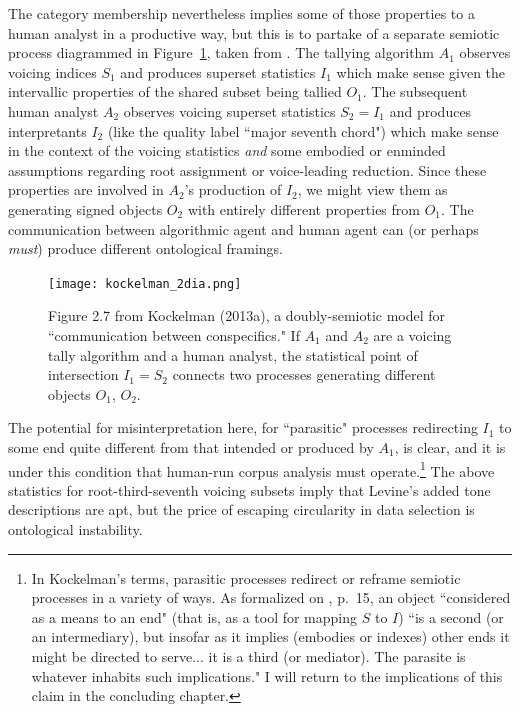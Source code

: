 The category membership nevertheless implies some of those properties to a human analyst in a productive way, but this is to partake of a separate semiotic process diagrammed in Figure~\ref{kockelman_2dia}, taken from \cite{kockelman2013}.  The tallying algorithm $A_1$ observes voicing indices $S_1$ and produces superset statistics $I_1$ which make sense given the intervallic properties of the shared subset being tallied $O_1$.  The subsequent human analyst $A_2$ observes voicing superset statistics $S_2 = I_1$ and produces interpretants $I_2$ (like the quality label ``major seventh chord") which make sense in the context of the voicing statistics \emph{and} some embodied or enminded assumptions regarding root assignment or voice-leading reduction.  Since these properties are involved in $A_2$'s production of $I_2$, we might view them as generating signed objects $O_2$ with entirely different properties from $O_1$.  The communication between algorithmic agent and human agent can (or perhaps \emph{must}) produce different ontological framings.

\begin{figure}%
	\caption{Figure 2.7 from Kockelman (2013a), a doubly-semiotic model for ``communication between conspecifics."  If $A_1$ and $A_2$ are a voicing tally algorithm and a human analyst, the statistical point of intersection $I_1 = S_2$ connects two processes generating different objects $O_1$, $O_2$.}
	\label{kockelman_2dia}
	\centering
	\texttt{[image: kockelman\_2dia.png]}
\end{figure}

The potential for misinterpretation here, for ``parasitic" processes redirecting $I_1$ to some end quite different from that intended or produced by $A_1$, is clear, and it is under this condition that human-run corpus analysis must operate.\footnote{In Kockelman's terms, parasitic processes redirect or reframe semiotic processes in a variety of ways.  As formalized on \cite{kockelman2013}, p.\ 15, an object ``considered as a means to an end" (that is, as a tool for mapping $S$ to $I$) ``is a second (or an intermediary), but insofar as it implies (embodies or indexes) other ends it might be directed to serve... it is a third (or mediator).  The parasite is whatever inhabits such implications."  I will return to the implications of this claim in the concluding chapter.}  The above statistics for root-third-seventh voicing subsets imply that Levine's added tone descriptions are apt, but the price of escaping circularity in data selection is ontological instability.

